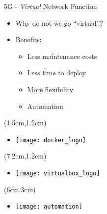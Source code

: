 \begin{frame}{5G - \textit{Virtual} Network Function}
  \begin{itemize}
    \item[]<1-> Why do not we go ``virtual''?
  \end{itemize}

  \begin{itemize}
  \item[]<2-> Benefits:
    \begin{itemize}
    \item<3-> Less maintenance costs
    \item<4-> Less time to deploy
    \item<5-> More flexibility
    \item<6-> Automation
    \end{itemize}
  \end{itemize}



  \begin{textblock*}{5cm}(1.5cm,1.2cm)
    \begin{itemize}
    \item[]<2-> \texttt{[image: docker\_logo]}
    \end{itemize}
  \end{textblock*}

  \begin{textblock*}{5cm}(7.2cm,1.2cm)
    \begin{itemize}
    \item[]<3-> \texttt{[image: virtualbox\_logo]}
    \end{itemize}
  \end{textblock*}

  \begin{textblock*}{5cm}(6cm,3cm)
    \begin{itemize}
    \item[]<6-> \texttt{[image: automation]}
    \end{itemize}
  \end{textblock*}
\end{frame}
